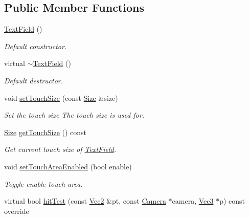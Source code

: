 \subsection*{Public Member Functions}
\begin{DoxyCompactItemize}
\item 
\mbox{\label{classui_1_1TextField_a86857eda71fe81dd1fd13c48d20e1662}} 
\hyperlink{classui_1_1TextField_a86857eda71fe81dd1fd13c48d20e1662}{Text\+Field} ()
\begin{DoxyCompactList}\small\item\em Default constructor. \end{DoxyCompactList}\item 
\mbox{\label{classui_1_1TextField_a13f37a172727f433a035ddde4f7edfb8}} 
virtual \hyperlink{classui_1_1TextField_a13f37a172727f433a035ddde4f7edfb8}{$\sim$\+Text\+Field} ()
\begin{DoxyCompactList}\small\item\em Default destructor. \end{DoxyCompactList}\item 
void \hyperlink{classui_1_1TextField_a3d221174c8a03b9a6c4fc90d1a1b8707}{set\+Touch\+Size} (const \hyperlink{classSize}{Size} \&size)
\begin{DoxyCompactList}\small\item\em Set the touch size The touch size is used for. \end{DoxyCompactList}\item 
\hyperlink{classSize}{Size} \hyperlink{classui_1_1TextField_a4aee73c65ff1fcf04d2049ff9ac5c050}{get\+Touch\+Size} () const
\begin{DoxyCompactList}\small\item\em Get current touch size of \hyperlink{classui_1_1TextField}{Text\+Field}. \end{DoxyCompactList}\item 
void \hyperlink{classui_1_1TextField_a3321c112af10e67485ca44ab44a1ae0c}{set\+Touch\+Area\+Enabled} (bool enable)
\begin{DoxyCompactList}\small\item\em Toggle enable touch area. \end{DoxyCompactList}\item 
virtual bool \hyperlink{classui_1_1TextField_a2ef36bd952e7ef2842ca043662b36669}{hit\+Test} (const \hyperlink{classVec2}{Vec2} \&pt, const \hyperlink{classCamera}{Camera} $\ast$camera, \hyperlink{classVec3}{Vec3} $\ast$p) const override

\end{DoxyCompactItemize}
